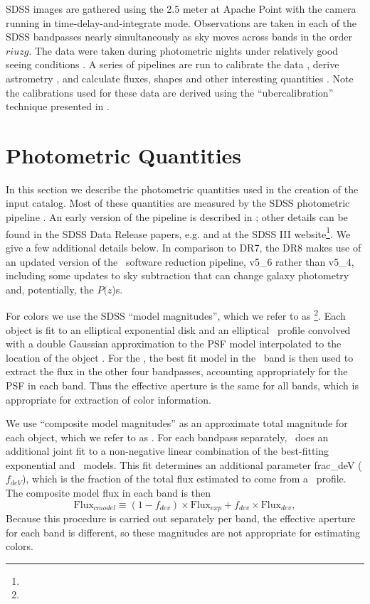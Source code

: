 \documentclass[12pt,preprint]{aastex}
\newcommand{\pofz}{$P(z$)}
\begin{document}
SDSS \citep{York00} images are gathered using the 2.5 meter at Apache Point
\citep{Gunn06} with the camera \citep{Gunn98} running in
time-delay-and-integrate mode.  Observations are taken in each of the SDSS
bandpasses \citep[{\it ugriz};][]{Fukugita96} nearly simultaneously as sky
moves across bands in the order $riuzg$.  The data were taken during
photometric nights under relatively good seeing conditions \citep{Hogg01}.  A
series of pipelines are run to calibrate the data
\citep{Nikhil08,Smith02,Tucker06}, derive astrometry \citep{Pier03}, and
calculate fluxes, shapes and other interesting quantities
\citep{LuptonADASS01}.  Note the calibrations used for these data are derived
using the ``ubercalibration'' technique presented in \citet{Nikhil08}.
\section{Photometric Quantities} \label{sec:photo}

In this section we describe the photometric quantities used in the creation of the
input catalog.  Most of these quantities are measured by the SDSS photometric
pipeline \photo. An early version of the pipeline is described in
\citet{LuptonADASS01};  other details can be found in the SDSS Data Release
papers, e.g. \citet{dr4} and at the SDSS III website\footnote{\sdssweb}.  We
 give a few additional details below.  In comparison to DR7, the DR8
makes use of an updated version of the \photo\ software reduction pipeline,
v5\_6 rather than v5\_4, including some updates to sky subtraction that can
change galaxy photometry and, potentially, the \pofz s.

For colors we use the SDSS ``model magnitudes'', which we refer to as
\modelmag \footnote{\DRatemags}.  Each object is fit to an elliptical
exponential disk and an elliptical \devauc\ profile convolved with a double
Gaussian approximation to the PSF model interpolated to the location of the
object \citep{LuptonADASS01,Sheldon04}.  For the \modelmag, the best fit model
in the \rmag\ band is then used to extract the flux in the other four
bandpasses, accounting appropriately for the PSF in each band. Thus the
effective aperture is the same for all bands, which is appropriate for
extraction of color information.

We use ``composite model magnitudes'' as an approximate total magnitude for
each object, which we refer to as \cmodelmag.  For each bandpass
separately, \photo\ does an additional joint fit to a non-negative
linear combination of the  best-fitting exponential and \devauc\
models. This fit determines an additional parameter {\sc frac\_deV}
($f_{deV}$), which is the fraction of the total flux estimated to come
from a \devauc\ profile.  The composite model flux in each band is then 
\begin{equation}
\textrm{Flux}_{cmodel} \equiv (1-f_{dev})\times \textrm{Flux}_{exp} + f_{dev} \times \textrm{Flux}_{dev},
\end{equation}
Because this procedure is carried out separately per band, the effective aperture for each band is
different, so these magnitudes are not appropriate for estimating colors.
\end{document}
